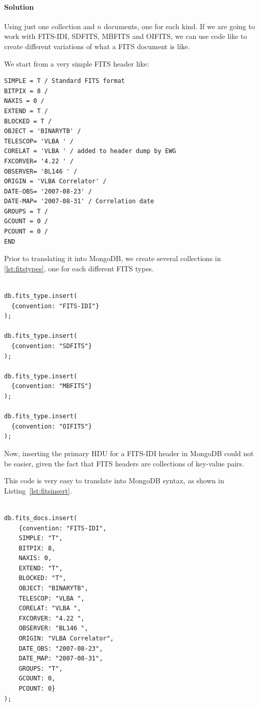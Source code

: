 \paragraph{Solution}

Using just one collection and $n$ documents, one for each kind. If we are going to work with FITS-IDI, SDFITS, MBFITS and OIFITS, we can use code like to create different variations of what a FITS document is like.

We start from a very simple FITS header like: 

\begin{lstlisting}[float,label=lst:fitsheader,caption=FITS sample.]
SIMPLE = T / Standard FITS format
BITPIX = 8 /
NAXIS = 0 /
EXTEND = T /
BLOCKED = T /
OBJECT = 'BINARYTB' /
TELESCOP= 'VLBA ' /
CORELAT = 'VLBA ' / added to header dump by EWG
FXCORVER= '4.22 ' /
OBSERVER= 'BL146 ' /
ORIGIN = 'VLBA Correlator' /
DATE-OBS= '2007-08-23' /
DATE-MAP= '2007-08-31' / Correlation date
GROUPS = T /
GCOUNT = 0 /
PCOUNT = 0 /
END
\end{lstlisting}

Prior to translating it into MongoDB, we create several collections in \ref{lst:fitstypes}, one for each different FITS types.

\begin{lstlisting}[float,label=lst:fitstypes,caption=MongoDB BSON code for creating the different FITS document types.]

db.fits_type.insert(
  {convention: "FITS-IDI"}
);

db.fits_type.insert(
  {convention: "SDFITS"}
);

db.fits_type.insert(
  {convention: "MBFITS"}
);

db.fits_type.insert(
  {convention: "OIFITS"}
);

\end{lstlisting}


Now, inserting the primary HDU for a  FITS-IDI header in MongoDB could not be
easier, given the fact that FITS headers are collections of key-value pairs. %

This code is very easy to translate into MongoDB syntax, as shown in Listing~\ref{lst:fitsinsert}.

\begin{lstlisting}[float,label=lst:fitsinsert,caption=MongoDB BSON code for adding FITS metadata to the NoSQL database.]

db.fits_docs.insert(
    {convention: "FITS-IDI",
    SIMPLE: "T",
    BITPIX: 8,
    NAXIS: 0,
    EXTEND: "T",
    BLOCKED: "T",
    OBJECT: "BINARYTB",
    TELESCOP: "VLBA ",
    CORELAT: "VLBA ",
    FXCORVER: "4.22 ",
    OBSERVER: "BL146 ",
    ORIGIN: "VLBA Correlator",
    DATE_OBS: "2007-08-23",
    DATE_MAP: "2007-08-31",
    GROUPS: "T",
    GCOUNT: 0,
    PCOUNT: 0}
);

\end{lstlisting}


